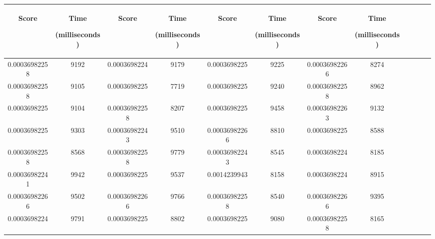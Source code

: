 \begin{table}[h]
  \centering
  \begin{tabular}{|c|c|c|c|c|c|c|c|c|c|c|c|} 
  \midrule
 \begin{sideways}Score\end{sideways}& \begin{sideways}Time\end{sideways} \begin{sideways} (milliseconds)\end{sideways}& \begin{sideways}Score\end{sideways}& \begin{sideways}Time\end{sideways}  \begin{sideways}(milliseconds)\end{sideways}& \begin{sideways}Score\end{sideways}& \begin{sideways}Time\end{sideways}  \begin{sideways}(milliseconds)\end{sideways}& \begin{sideways}Score\end{sideways}& \begin{sideways}Time\end{sideways}  \begin{sideways} (milliseconds)\end{sideways}\\
\midrule
0.00036982258&9192&0.0003698224&9179&0.0003698225&9225&0.00036982266&8274\\
\midrule
0.00036982258&9105&0.0003698225&7719&0.0003698225&9240&0.00036982258&8962\\
\midrule
0.0003698225&9104&0.00036982258&8207&0.0003698225&9458&0.00036982263&9132\\
\midrule
0.0003698225&9303&0.00036982243&9510&0.00036982266&8810&0.0003698225&8588\\
\midrule
0.00036982258&8568&0.00036982258&9779&0.00036982243&8545&0.0003698224&8185\\
\midrule
0.00036982241&9942&0.0003698225&9537&0.0014239943&8158&0.0003698224&8915\\
\midrule
0.00036982266&9502&0.00036982266&9766&0.00036982258&8540&0.00036982266&9395\\
\midrule
0.0003698224&9791&0.0003698225&8802&0.0003698225&9080&0.00036982258&8165\\

\end{tabular}
\end{table}
